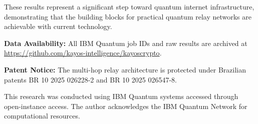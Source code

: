 \documentclass[twocolumn,preprintnumbers,amsmath,amssymb,prl]{revtex4-2}
\begin{document}
These results represent a significant step toward quantum internet infrastructure, demonstrating that the building blocks for practical quantum relay networks are achievable with current technology.

\textbf{Data Availability:} All IBM Quantum job IDs and raw results are archived at \url{https://github.com/kayos-intelligence/kayoscrypto}.

\textbf{Patent Notice:} The multi-hop relay architecture is protected under Brazilian patents BR 10 2025 026228-2 and BR 10 2025 026547-8.

\begin{acknowledgments}
This research was conducted using IBM Quantum systems accessed through open-instance access. The author acknowledges the IBM Quantum Network for computational resources.
\end{acknowledgments}
\end{document}
